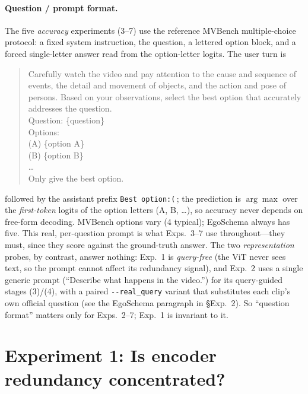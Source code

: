 \documentclass[11pt]{article}
\begin{document}
\paragraph{Question / prompt format.} The five \emph{accuracy} experiments (3--7) use the
reference MVBench multiple-choice protocol: a fixed system instruction, the question, a
lettered option block, and a forced single-letter answer read from the option-letter
logits. The user turn is

\begin{quote}\small\ttfamily
Carefully watch the video and pay attention to the cause and sequence of events, the
detail and movement of objects, and the action and pose of persons. Based on your
observations, select the best option that accurately addresses the question.\\
Question: \{question\}\\
Options:\\
(A) \{option A\}\\
(B) \{option B\}\\
\ldots\\
Only give the best option.
\end{quote}

\noindent followed by the assistant prefix \texttt{Best option:(}\,; the prediction is
$\arg\max$ over the \emph{first-token} logits of the option letters (A, B, \dots), so
accuracy never depends on free-form decoding. MVBench options vary (4 typical); EgoSchema
always has five. This real, per-question prompt is what Exps.~3--7 use throughout---they
must, since they score against the ground-truth answer. The two \emph{representation}
probes, by contrast, answer nothing: Exp.~1 is \emph{query-free} (the ViT never sees text,
so the prompt cannot affect its redundancy signal), and Exp.~2 uses a single generic prompt
(``Describe what happens in the video.'') for its query-guided stages (3)/(4), with a
paired \texttt{-{}-real\_query} variant that substitutes each clip's own official question
(see the EgoSchema paragraph in \S Exp.~2). So ``question format'' matters only for
Exps.~2--7; Exp.~1 is invariant to it.

\section{Experiment 1: Is encoder redundancy concentrated?}
\end{document}
